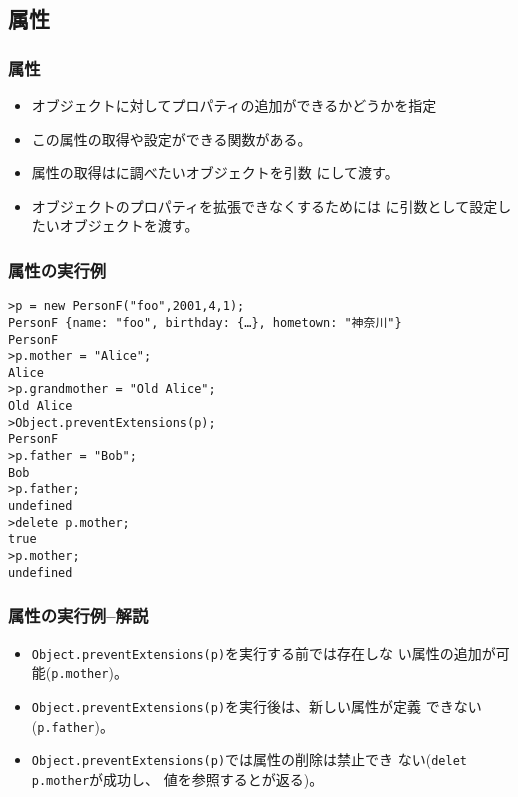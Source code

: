 \subsection{\protect{}属性}
\begin{frame}[containsverbatim]
 \frametitle{\protect{}属性}
\begin{itemize}
 \item オブジェクトに対してプロパティの追加ができるかどうかを指定
 \item この属性の取得や設定ができる関数がある。
 \item 属性の取得はに調べたいオブジェクトを引数
にして渡す。
 \item オブジェクトのプロパティを拡張できなくするためには
に引数として設定したいオブジェクトを渡す。
\end{itemize} 
\end{frame}
\begin{frame}[containsverbatim]
 \frametitle{\protect{}属性の実行例}
 {\scriptsize
 \begin{Verbatim}
>p = new PersonF("foo",2001,4,1);
PersonF {name: "foo", birthday: {…}, hometown: "神奈川"}
PersonF
>p.mother = "Alice";
Alice
>p.grandmother = "Old Alice";
Old Alice
>Object.preventExtensions(p);
PersonF
>p.father = "Bob";
Bob
>p.father;
undefined
>delete p.mother;
true
>p.mother;
undefined
\end{Verbatim}
}
\end{frame}
\begin{frame}[containsverbatim]
\frametitle{\protect{}属性の実行例--解説}
\begin{itemize}
 \item \texttt{Object.preventExtensions(p)}を実行する前では存在しな
       い属性の追加が可能(\texttt{p.mother})。
 \item \texttt{Object.preventExtensions(p)}を実行後は、新しい属性が定義
			 できない(\texttt{p.father})。
 \item \texttt{Object.preventExtensions(p)}では属性の削除は禁止でき
       ない(\texttt{delet p.mother}が成功し、
			 値を参照するとが返る)。
\end{itemize}
\end{frame}
